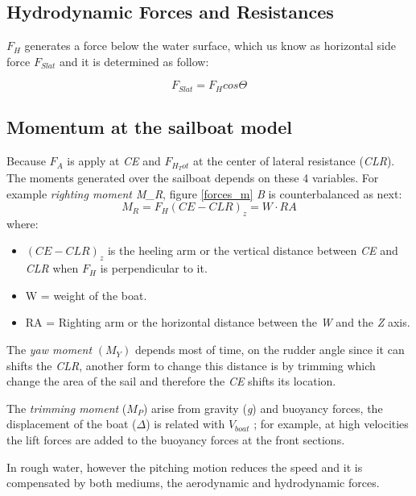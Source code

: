 \subsection{Hydrodynamic Forces and Resistances}
$F_{H}$ generates a force below the water surface, which us know as horizontal side force $F_{Slat}$ and it is determined as follow: \par
\begin{equation}
    F_{Slat}= F_{H}cos \Theta
\end{equation}

\subsection{Momentum at the sailboat model}
Because $F_{A}$ is apply at \textit{CE} and $F_{H_Tot}$ at the center of lateral resistance (\textit{CLR}). The moments generated over the sailboat depends on these 4 variables. For example \textit{righting moment M_{R}}, figure \ref{forces_m} \textit{B} is counterbalanced as next: 
\begin{equation}\label{eq:right_mom}
    M_{R}=F_{H}(CE-CLR)_{z}=W \cdot RA
\end{equation}
where:\par
\begin{itemize}
    \item $(CE-CLR)_{z}$ is the heeling arm or the vertical distance between \textit{CE} and \textit{CLR} when $F_{H}$ is perpendicular to it.
    \item W = weight of the boat.
    \item RA = Righting arm or the horizontal distance between the \textit{W} and the \textit{Z} axis.
\end{itemize}
The \textit{yaw moment} $(M_{Y})$ depends most of time, on the rudder angle since it can shifts the \textit{CLR}, another form to change this distance is by trimming which change the area of the sail and therefore the \textit{CE} shifts its location.\par 
The \textit{trimming moment} ($M_{P}$) arise from gravity (\textit{g}) and buoyancy forces, the displacement of the boat (\textit{$\Delta$}) is related with $V_{boat}$ ; for example, at high velocities the lift forces are added to the buoyancy forces at the front sections.\par 
In rough water, however the pitching motion reduces the speed and it is compensated by both mediums, the aerodynamic and hydrodynamic forces.\par %

